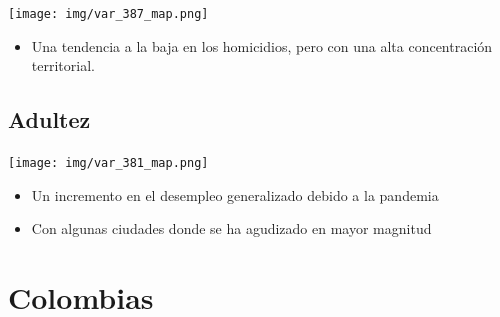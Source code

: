 \documentclass[aspectratio=169]{beamer}
\begin{document}
    
        \begin{slide}{15} 
            \begin{imagecolumn}
                \texttt{[image: img/var\_387\_map.png]}
            \end{imagecolumn}
            \begin{textcolumn}
                \begin{itemize}
                    \item Una tendencia a la baja en los homicidios, pero con una alta concentración territorial.
                \end{itemize}
            \end{textcolumn}
    \printcolumns
    \end{slide}
    
    
    
    
    
    \subsection{Adultez}
    
    \begin{slide}{16} 
            \begin{imagecolumn}
                \texttt{[image: img/var\_381\_map.png]}
            \end{imagecolumn}
            \begin{textcolumn}
                \begin{itemize}
                    \item Un incremento en el desempleo generalizado debido a la pandemia
                    \item Con algunas ciudades donde se ha agudizado en mayor magnitud
                \end{itemize}
            \end{textcolumn}
    \printcolumns
    \end{slide}
    
      \section{Colombias}
    
\end{document}
